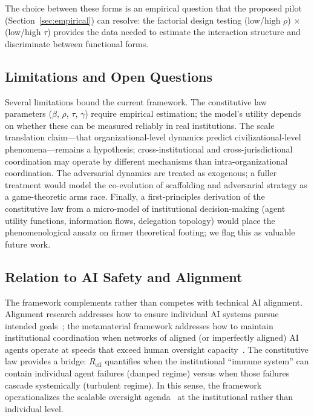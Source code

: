 \documentclass[runningheads]{llncs}
\begin{document}
The choice between these forms is an empirical question that the proposed pilot (Section~\ref{sec:empirical}) can resolve: the factorial design testing (low/high $\rho$) $\times$ (low/high $\tau$) provides the data needed to estimate the interaction structure and discriminate between functional forms.

\subsection{Limitations and Open Questions}

Several limitations bound the current framework. The constitutive law parameters ($\beta$, $\rho$, $\tau$, $\gamma$) require empirical estimation; the model's utility depends on whether these can be measured reliably in real institutions. The scale translation claim---that organizational-level dynamics predict civilizational-level phenomena---remains a hypothesis; cross-institutional and cross-jurisdictional coordination may operate by different mechanisms than intra-organizational coordination. The adversarial dynamics are treated as exogenous; a fuller treatment would model the co-evolution of scaffolding and adversarial strategy as a game-theoretic arms race. Finally, a first-principles derivation of the constitutive law from a micro-model of institutional decision-making (agent utility functions, information flows, delegation topology) would place the phenomenological ansatz on firmer theoretical footing; we flag this as valuable future work.

\subsection{Relation to AI Safety and Alignment}

The framework complements rather than competes with technical AI alignment. Alignment research addresses how to ensure individual AI systems pursue intended goals~\cite{amodei2016concrete,gabriel2020artificial}; the metamaterial framework addresses how to maintain institutional coordination when networks of aligned (or imperfectly aligned) AI agents operate at speeds that exceed human oversight capacity~\cite{hendrycks2022xrisk}. The constitutive law provides a bridge: $R_{\mathrm{eff}}$ quantifies when the institutional ``immune system'' can contain individual agent failures (damped regime) versus when those failures cascade systemically (turbulent regime). In this sense, the framework operationalizes the scalable oversight agenda~\cite{bowman2022measuring} at the institutional rather than individual level.
\end{document}
